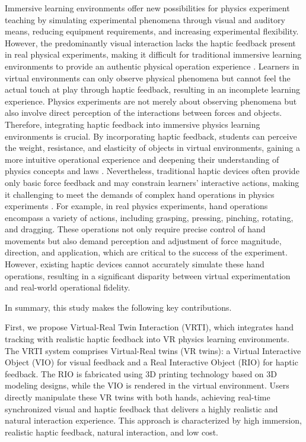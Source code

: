 \documentclass[runningheads]{llncs}
\begin{document}
Immersive learning environments offer new possibilities for physics experiment teaching by simulating experimental phenomena through visual and auditory means, reducing equipment requirements, and increasing experimental flexibility. However, the predominantly visual interaction lacks the haptic feedback present in real physical experiments, making it difficult for traditional immersive learning environments to provide an authentic physical operation experience \cite{giri2021application}. Learners in virtual environments can only observe physical phenomena but cannot feel the actual touch at play through haptic feedback, resulting in an incomplete learning experience. Physics experiments are not merely about observing phenomena but also involve direct perception of the interactions between forces and objects. Therefore, integrating haptic feedback into immersive physics learning environments is crucial. By incorporating haptic feedback, students can perceive the weight, resistance, and elasticity of objects in virtual environments, gaining a more intuitive operational experience and deepening their understanding of physics concepts and laws \cite{minaker2016handson}. Nevertheless, traditional haptic devices often provide only basic force feedback and may constrain learners' interactive actions, making it challenging to meet the demands of complex hand operations in physics experiments \cite{bonfert2023challenges}. For example, in real physics experiments, hand operations encompass a variety of actions, including grasping, pressing, pinching, rotating, and dragging. These operations not only require precise control of hand movements but also demand perception and adjustment of force magnitude, direction, and application, which are critical to the success of the experiment. However, existing haptic devices cannot accurately simulate these hand operations, resulting in a significant disparity between virtual experimentation and real-world operational fidelity.

In summary, this study makes the following key contributions.

First, we propose Virtual-Real Twin Interaction (VRTI), which integrates hand tracking with realistic haptic feedback into VR physics learning environments. The VRTI system comprises Virtual-Real twins (VR twins): a Virtual Interactive Object (VIO) for visual feedback and a Real Interactive Object (RIO) for haptic feedback. The RIO is fabricated using 3D printing technology based on 3D modeling designs, while the VIO is rendered in the virtual environment. Users directly manipulate these VR twins with both hands, achieving real-time synchronized visual and haptic feedback that delivers a highly realistic and natural interaction experience. This approach is characterized by high immersion, realistic haptic feedback, natural interaction, and low cost.
\end{document}
